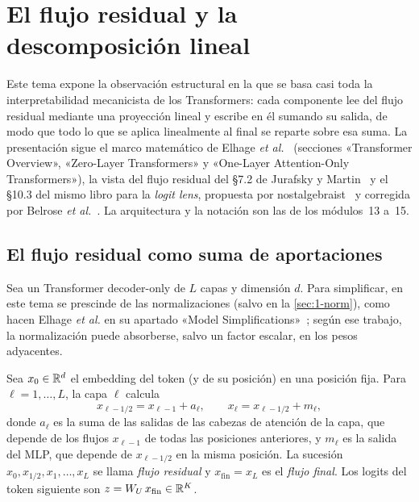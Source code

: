 \chapter{El flujo residual y la descomposición lineal}
\label{tema:1}

Este tema expone la observación estructural en la que se basa casi toda la interpretabilidad mecanicista de los Transformers: cada componente lee del flujo residual mediante una proyección lineal y escribe en él sumando su salida, de modo que todo lo que se aplica linealmente al final se reparte sobre esa suma. La presentación sigue el marco matemático de Elhage \emph{et al.}~\cite{elhage21} (secciones «Transformer Overview», «Zero-Layer Transformers» y «One-Layer Attention-Only Transformers»), la vista del flujo residual del §7.2 de Jurafsky y Martin~\cite{jm3} y el §10.3 del mismo libro para la \emph{logit lens}, propuesta por nostalgebraist~\cite{nostalgebraist} y corregida por Belrose \emph{et al.}~\cite{belrose}. La arquitectura y la notación son las de los módulos~13 a~15.

\section{El flujo residual como suma de aportaciones}

Sea un Transformer decoder-only de $L$ capas y dimensión $d$. Para simplificar, en este tema se prescinde de las normalizaciones (salvo en la \cref{sec:1-norm}), como hacen Elhage \emph{et al.} en su apartado «Model Simplifications»~\cite{elhage21}; según ese trabajo, la normalización puede absorberse, salvo un factor escalar, en los pesos adyacentes.

\begin{definicion}\label{def:flujo}
Sea $x_0\in\mathbb{R}^{d}$ el embedding del token (y de su posición) en una posición fija. Para $\ell=1,\dots,L$, la capa $\ell$ calcula
\[
x_{\ell-1/2}=x_{\ell-1}+a_\ell,\qquad x_\ell=x_{\ell-1/2}+m_\ell,
\]
donde $a_\ell$ es la suma de las salidas de las cabezas de atención de la capa, que depende de los flujos $x_{\ell-1}$ de todas las posiciones anteriores, y $m_\ell$ es la salida del MLP, que depende de $x_{\ell-1/2}$ en la misma posición. La sucesión $x_0,x_{1/2},x_1,\dots,x_L$ se llama \emph{flujo residual} y $x_{\mathrm{fin}}=x_L$ es el \emph{flujo final}. Los logits del token siguiente son $z=W_{U}\,x_{\mathrm{fin}}\in\mathbb{R}^{K}$.
\end{definicion}

